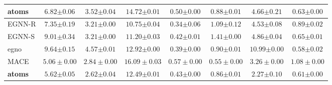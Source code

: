 \begin{table}[t]
{\begin{tabular}{lccccccc}
        \textbf{\gls{atoms}} & \(\mathbf{6.82}{\scriptstyle \pm0.06}\) & \(\mathbf{3.52}{\scriptstyle \pm0.04}\) & \(14.72{\scriptstyle \pm0.01}\) & \(0.50{\scriptstyle \pm0.00}\) & \(\mathbf{0.88}{\scriptstyle \pm0.01}\) & \(\mathbf{4.66}{\scriptstyle \pm0.21}\) & \(0.63{\scriptstyle \pm0.00}\) \\
        \midrule
        EGNN-R & \(7.35{\scriptstyle \pm0.19}\) & \(3.21{\scriptstyle \pm0.00}\) & \(\mathbf{10.75}{\scriptstyle \pm0.04}\) & \(\mathbf{0.34}{\scriptstyle \pm0.06}\) & \(1.09{\scriptstyle \pm0.12}\) & \(4.53{\scriptstyle \pm0.08}\) & \(0.89{\scriptstyle \pm0.02}\) \\
        EGNN-S & \(9.01{\scriptstyle \pm0.34}\) & \(3.21{\scriptstyle \pm0.00}\) & \(11.20{\scriptstyle \pm0.03}\) & \(0.42{\scriptstyle \pm0.01}\) & \(1.41{\scriptstyle \pm0.00}\) & \(4.86{\scriptstyle \pm0.04}\) & \(0.65{\scriptstyle \pm0.01}\) \\
        \gls{egno} & \(9.64{\scriptstyle \pm0.15}\) & \(4.57{\scriptstyle \pm0.01}\) & \(12.92{\scriptstyle \pm0.00}\) & \(0.39{\scriptstyle \pm0.00}\) & \(0.90{\scriptstyle \pm0.01}\) & \(10.99{\scriptstyle \pm0.00}\) & \(\mathbf{0.58}{\scriptstyle \pm0.02}\) \\
         MACE & \(5.06\pm\scriptstyle{0.00}\) & \(2.84\pm\scriptstyle{0.00}\) & \(16.09\pm\scriptstyle{0.03}\) & \(0.57\pm\scriptstyle{0.00}\) & \(0.55\pm\scriptstyle{0.00}\) & \(3.26\pm\scriptstyle{0.00}\) & \(1.08\pm\scriptstyle{0.00}\) \\
        \textbf{\gls{atoms}} & \(\mathbf{5.62}{\scriptstyle \pm0.05}\) & \(\mathbf{2.62}{\scriptstyle \pm0.04}\) & \(12.49{\scriptstyle \pm0.01}\) & \(0.43{\scriptstyle \pm0.00}\) & \(\mathbf{0.86}{\scriptstyle \pm0.01}\) & \(\mathbf{2.27}{\scriptstyle \pm0.10}\) & \(0.61{\scriptstyle \pm0.00}\) \\
        \bottomrule
    \end{tabular}
}
\end{table}




